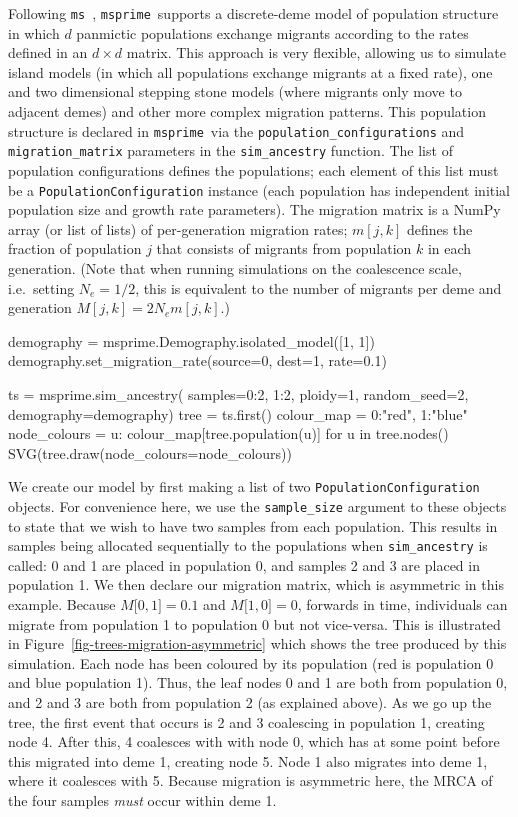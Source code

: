 \documentclass[graybox]{svmult}
\newcommand{\msprime}[0]{\texttt{msprime}}
\newcommand{\ms}[0]{\texttt{ms}}
\begin{document}
Following \ms~\citep{hudson2002generating}, \msprime\ supports a
discrete-deme model of population structure in which
\(d\) panmictic populations exchange migrants according to the rates
defined in an \(d \times d\) matrix. This approach is very flexible,
allowing us to simulate island models (in which all populations exchange
migrants at a fixed rate), one and two dimensional stepping stone models
(where migrants only move to adjacent demes) and other more complex
migration patterns. This population structure is declared in \msprime\ via the
\texttt{population\_configurations} and \texttt{migration\_matrix}
parameters in the \texttt{sim\_ancestry} function. The list of population
configurations defines the populations; each element of this list must
be a \texttt{PopulationConfiguration} instance (each population has
independent initial population size and growth rate parameters). The
migration matrix is a NumPy array (or list of lists) of per-generation
migration rates; \(m[j,k]\) defines the fraction of population \(j\)
that consists of migrants from population \(k\) in each generation. (Note that when running simulations on the coalescence scale, i.e.\ setting \(N_e=1/2\), this is equivalent to the number of migrants per deme and generation \(M[j,k]=2 N_e m[j,k]\).)

\begin{pythoncode}
demography =  msprime.Demography.isolated_model([1, 1])
demography.set_migration_rate(source=0, dest=1, rate=0.1)

ts  = msprime.sim_ancestry(
    samples={0:2, 1:2}, ploidy=1,
    random_seed=2, demography=demography)
tree = ts.first()
colour_map = {0:"red", 1:"blue"}
node_colours = {u: colour_map[tree.population(u)] for u in tree.nodes()}
SVG(tree.draw(node_colours=node_colours))
\end{pythoncode}

We create our model by first making a list of two
\texttt{PopulationConfiguration} objects. For convenience here, we use
the \texttt{sample\_size} argument to these objects to state that we
wish to have two samples from each population. This results in samples
being allocated sequentially to the populations when \texttt{sim\_ancestry}
is called: 0 and 1 are placed in population 0, and samples 2 and 3 are
placed in population 1. We then declare our migration matrix, which is
asymmetric in this example. Because ${M{[}0,1{]} = 0.1}$ and
${M{[}1, 0{]} = 0}$, forwards in time, individuals can migrate
from population 1 to population 0 but not vice-versa. This is illustrated in
Figure~\ref{fig-trees-migration-asymmetric} which shows the tree
produced by this simulation. Each node has been coloured by its
population (red is population 0 and blue population 1). Thus, the leaf
nodes 0 and 1 are both from population 0, and 2 and 3 are both from
population 2 (as explained above). As we go up the tree, the first event
that occurs is 2 and 3 coalescing in population 1, creating node 4.
After this, 4 coalesces with with node 0, which has at some point before
this migrated into deme 1, creating node 5. Node 1 also migrates into
deme 1, where it coalesces with 5. Because migration is asymmetric here,
the MRCA of the four samples \emph{must} occur
within deme 1.
\end{document}
